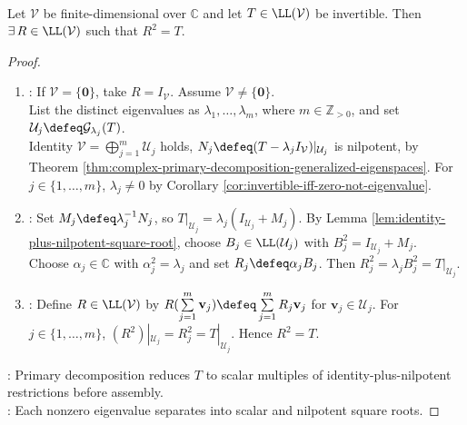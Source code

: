 \begin{theorem} \label{thm:complex-invertible-operator-has-square-root} \\
Let $\mathcal{V}$ be finite-dimensional over $\mathbb{C}$ and let $T\in\LL(\mathcal{V})$ be invertible. Then $\exists\,R\in\LL(\mathcal{V})$ such that $R^2=T$.
\begin{proof}
\begin{enumerate}[label=(\roman*)]
\setlength{\itemsep}{0pt}
\item {}: If $\mathcal{V}=\{\mathbf{0}\}$, take $R=I_{\mathcal{V}}$. Assume $\mathcal{V}\neq\{\mathbf{0}\}$.\\
List the distinct eigenvalues as $\lambda_1,\ldots,\lambda_m$, where $m\in\mathbb{Z}_{>0}$, and set $\mathcal{U}_j\defeq\mathcal{G}_{\lambda_j}(T)$.\\
Identity $\mathcal{V}=\bigoplus\limits_{j=1}^m\mathcal{U}_j$ holds, $N_j\defeq(T-\lambda_jI_{\mathcal{V}})|_{\mathcal{U}_j}$ is nilpotent, by Theorem \ref{thm:complex-primary-decomposition-generalized-eigenspaces}. For $j\in\{1,\ldots,m\}$, $\lambda_j\neq0$ by Corollary \ref{cor:invertible-iff-zero-not-eigenvalue}.
\item {}: Set $M_j\defeq\lambda_j^{-1}N_j$, so $T|_{\mathcal{U}_j}=\lambda_j(I_{\mathcal{U}_j}+M_j)$. By Lemma \ref{lem:identity-plus-nilpotent-square-root}, choose $B_j\in\LL(\mathcal{U}_j)$ with $B_j^2=I_{\mathcal{U}_j}+M_j$.\\
Choose $\alpha_j\in\mathbb{C}$ with $\alpha_j^2=\lambda_j$ and set $R_j\defeq\alpha_jB_j$. Then $R_j^2=\lambda_jB_j^2=T|_{\mathcal{U}_j}$.
\item {}: Define $R\in\LL(\mathcal{V})$ by $R(\sum\limits_{j=1}^m\mathbf{v}_j)\defeq\sum\limits_{j=1}^mR_j\mathbf{v}_j$ for $\mathbf{v}_j\in\mathcal{U}_j$. For $j\in\{1,\ldots,m\}$, $(R^2)|_{\mathcal{U}_j}=R_j^2=T|_{\mathcal{U}_j}$. Hence $R^2=T$.
\end{enumerate}
: Primary decomposition reduces $T$ to scalar multiples of identity-plus-nilpotent restrictions before assembly.\\
: Each nonzero eigenvalue separates into scalar and nilpotent square roots.
\end{proof}
\end{theorem}
